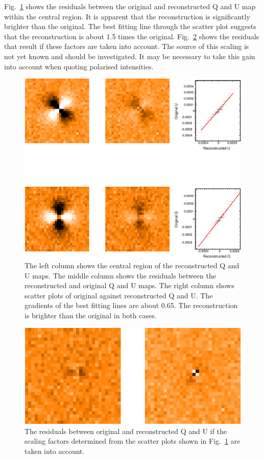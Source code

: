 \documentclass[twoside,11pt]{starlink}
\begin{document}
Fig.~\ref{fig:recon2} shows the residuals between the original and
reconstructed Q and U map within the central region. It is apparent that
the reconstruction is significantly brighter than the original. The best
fitting line through the scatter plot suggests that the reconstruction is
about 1.5 times the original. Fig.~\ref{fig:recon3} shows the residuals
that result if these factors are taken into account. The source of this
scaling is not yet known and should be investigated. It may be necessary
to take this gain into account when quoting polarised intensities.

\begin{figure}
\includegraphics[width=\columnwidth]{recon2}
\caption{The left column shows the central region of the reconstructed Q
and U maps. The middle column shows the residuals between the
reconstructed and original Q and U maps. The right column shows
scatter plots of original against reconstructed Q and U. The gradients of
the best fitting lines are about 0.65. The reconstruction is brighter
than the original in both cases.}
\label{fig:recon2}
\end{figure}

\begin{figure}
\includegraphics[width=\columnwidth]{recon3}
\caption{The residuals between original and reconstructed Q and U if the
scaling factors determined from the scatter plots shown in
Fig.~\ref{fig:recon2} are taken into account.}
\label{fig:recon3}
\end{figure}
\end{document}
